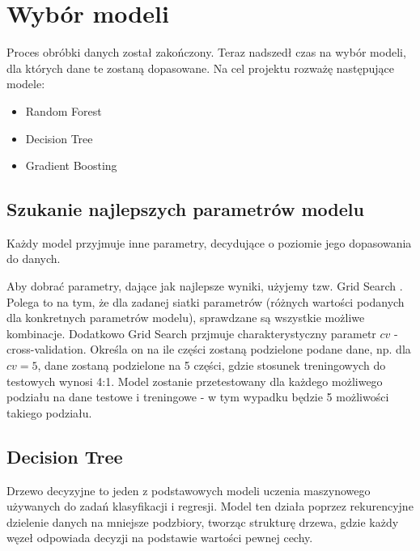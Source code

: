 \documentclass{article}
\begin{document}
\section{Wybór modeli}
Proces obróbki danych został zakończony. Teraz nadszedł czas na wybór modeli, dla których dane te zostaną dopasowane. Na cel projektu rozważę następujące modele:
\begin{itemize}
    \item Random Forest
    \item Decision Tree
    \item Gradient Boosting
\end{itemize}

\subsection{Szukanie najlepszych parametrów modelu}
Każdy model przyjmuje inne parametry, decydujące o poziomie jego dopasowania do danych. 

Aby dobrać parametry, dające jak najlepsze wyniki, użyjemy tzw. Grid Search \cite{grid_search_cv}. Polega to na tym, że dla zadanej siatki parametrów (różnych wartości podanych dla konkretnych parametrów modelu), sprawdzane są wszystkie możliwe kombinacje. Dodatkowo Grid Search przjmuje charakterystyczny parametr $cv$ - cross-validation. Określa on na ile części zostaną podzielone podane dane, np. dla $cv=5$, dane zostaną podzielone na 5 części, gdzie stosunek treningowych do testowych wynosi 4:1. Model zostanie przetestowany dla każdego możliwego podziału na dane testowe i treningowe - w tym wypadku będzie 5 możliwości takiego podziału.

\subsection{Decision Tree}
Drzewo decyzyjne \cite{decision_tree} to jeden z podstawowych modeli uczenia maszynowego używanych do zadań klasyfikacji i regresji. Model ten działa poprzez rekurencyjne dzielenie danych na mniejsze podzbiory, tworząc strukturę drzewa, gdzie każdy węzeł odpowiada decyzji na podstawie wartości pewnej cechy.
\end{document}
